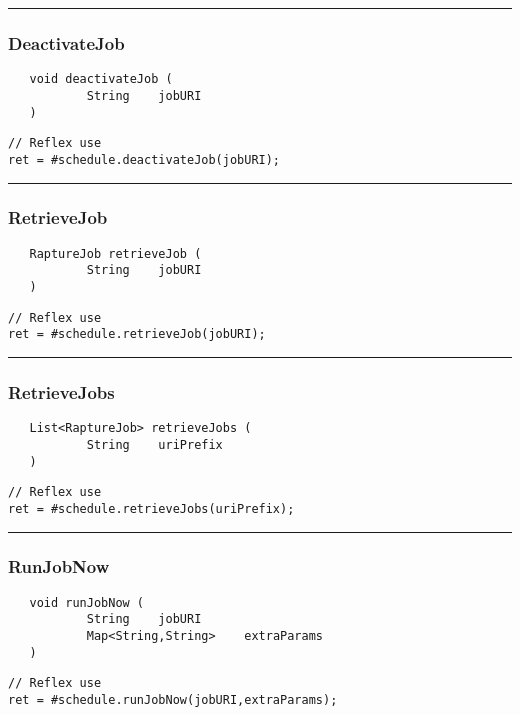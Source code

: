 \rule{15cm}{2pt}
\subsubsection{DeactivateJob}
\label{Api:DeactivateJob}
\begin{verbatim}
   void deactivateJob (
           String    jobURI
   )
\end{verbatim}
\begin{lstlisting}[language=reflex]
// Reflex use
ret = #schedule.deactivateJob(jobURI);
\end{lstlisting}



\rule{15cm}{2pt}
\subsubsection{RetrieveJob}
\label{Api:RetrieveJob}
\begin{verbatim}
   RaptureJob retrieveJob (
           String    jobURI
   )
\end{verbatim}
\begin{lstlisting}[language=reflex]
// Reflex use
ret = #schedule.retrieveJob(jobURI);
\end{lstlisting}



\rule{15cm}{2pt}
\subsubsection{RetrieveJobs}
\label{Api:RetrieveJobs}
\begin{verbatim}
   List<RaptureJob> retrieveJobs (
           String    uriPrefix
   )
\end{verbatim}
\begin{lstlisting}[language=reflex]
// Reflex use
ret = #schedule.retrieveJobs(uriPrefix);
\end{lstlisting}



\rule{15cm}{2pt}
\subsubsection{RunJobNow}
\label{Api:RunJobNow}
\begin{verbatim}
   void runJobNow (
           String    jobURI
           Map<String,String>    extraParams
   )
\end{verbatim}
\begin{lstlisting}[language=reflex]
// Reflex use
ret = #schedule.runJobNow(jobURI,extraParams);
\end{lstlisting}



